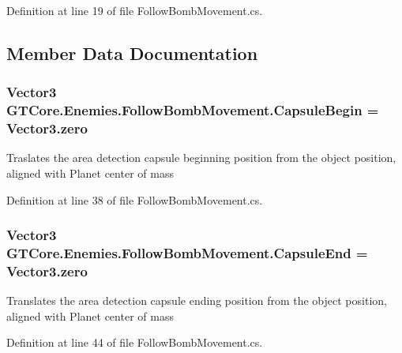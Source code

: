Definition at line 19 of file Follow\+Bomb\+Movement.\+cs.



\subsection{Member Data Documentation}
\hypertarget{class_g_t_core_1_1_enemies_1_1_follow_bomb_movement_a80e25eb90a06eabb7bd3d45c2b0d8d24}{}
\subsubsection[{Capsule\+Begin}]{\setlength{\rightskip}{0pt plus 5cm}Vector3 G\+T\+Core.\+Enemies.\+Follow\+Bomb\+Movement.\+Capsule\+Begin = Vector3.\+zero}\label{class_g_t_core_1_1_enemies_1_1_follow_bomb_movement_a80e25eb90a06eabb7bd3d45c2b0d8d24}


Traslates the area detection capsule beginning position from the object position, aligned with Planet center of mass 



Definition at line 38 of file Follow\+Bomb\+Movement.\+cs.

\hypertarget{class_g_t_core_1_1_enemies_1_1_follow_bomb_movement_a77d4cf25b4178b1e27b8c7251b1239db}{}
\subsubsection[{Capsule\+End}]{\setlength{\rightskip}{0pt plus 5cm}Vector3 G\+T\+Core.\+Enemies.\+Follow\+Bomb\+Movement.\+Capsule\+End = Vector3.\+zero}\label{class_g_t_core_1_1_enemies_1_1_follow_bomb_movement_a77d4cf25b4178b1e27b8c7251b1239db}


Translates the area detection capsule ending position from the object position, aligned with Planet center of mass 



Definition at line 44 of file Follow\+Bomb\+Movement.\+cs.

